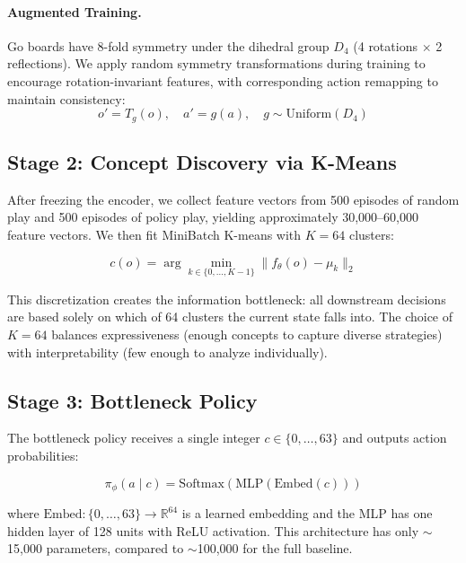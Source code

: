 \documentclass[11pt,a4paper]{article}
\newcommand{\encoder}{f_\theta}
\newcommand{\policy}{\pi_\phi}
\begin{document}
\paragraph{Augmented Training.}
Go boards have 8-fold symmetry under the dihedral group $D_4$ (4 rotations $\times$ 2 reflections). We apply random symmetry transformations during training to encourage rotation-invariant features, with corresponding action remapping to maintain consistency:
\begin{equation}
    o' = T_g(o), \quad a' = g(a), \quad g \sim \text{Uniform}(D_4)
\end{equation}

\subsection{Stage 2: Concept Discovery via K-Means}

After freezing the encoder, we collect feature vectors from 500 episodes of random play and 500 episodes of policy play, yielding approximately 30,000--60,000 feature vectors. We then fit MiniBatch K-means with $K=64$ clusters:

\begin{equation}
    c(o) = \arg\min_{k \in \{0, \ldots, K-1\}} \| \encoder(o) - \mu_k \|_2
\end{equation}

This discretization creates the information bottleneck: all downstream decisions are based solely on which of 64 clusters the current state falls into. The choice of $K=64$ balances expressiveness (enough concepts to capture diverse strategies) with interpretability (few enough to analyze individually).

\subsection{Stage 3: Bottleneck Policy}

The bottleneck policy receives a single integer $c \in \{0, \ldots, 63\}$ and outputs action probabilities:

\begin{equation}
    \policy(a \mid c) = \text{Softmax}(\text{MLP}(\text{Embed}(c)))
\end{equation}

where $\text{Embed}: \{0, \ldots, 63\} \to \mathbb{R}^{64}$ is a learned embedding and the MLP has one hidden layer of 128 units with ReLU activation. This architecture has only $\sim$15,000 parameters, compared to $\sim$100,000 for the full baseline.
\end{document}
